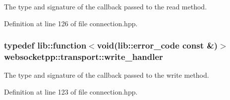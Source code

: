 The type and signature of the callback passed to the read method. 



Definition at line 126 of file connection.\+hpp.

\hypertarget{namespacewebsocketpp_1_1transport_addf5d728159e7aa2bce2a0df947b1560}{}
\subsubsection[{write\+\_\+handler}]{\setlength{\rightskip}{0pt plus 5cm}typedef lib\+::function$<$void(lib\+::error\+\_\+code const \&)$>$ {\bf websocketpp\+::transport\+::write\+\_\+handler}}\label{namespacewebsocketpp_1_1transport_addf5d728159e7aa2bce2a0df947b1560}


The type and signature of the callback passed to the write method. 



Definition at line 123 of file connection.\+hpp.

